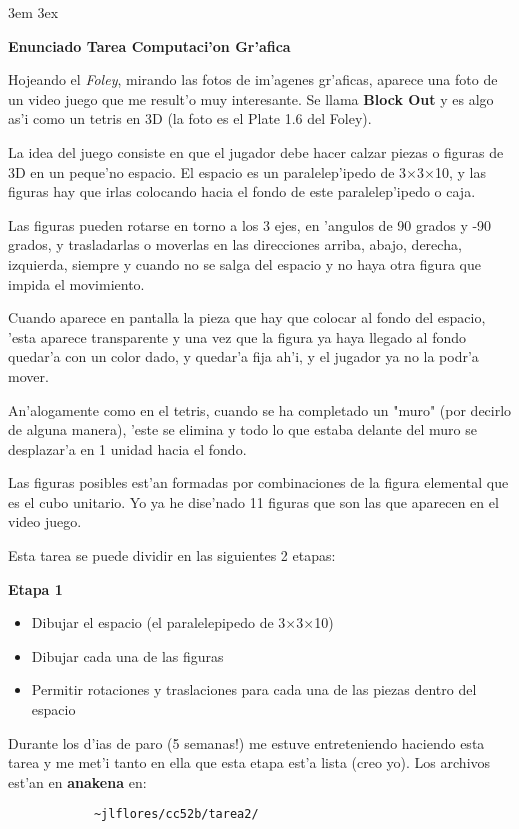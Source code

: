 \oddsidemargin 0cm
\textwidth 16cm 
\topmargin -1cm 
\headheight 0cm 
\textheight 22cm
\parindent 3em  
\parskip 3ex    


{\Large\bf Enunciado Tarea Computaci'on Gr'afica}

Hojeando el {\em Foley}, mirando las fotos de im'agenes gr'aficas, aparece una foto de un
video juego que me result'o muy interesante. Se llama {\bf Block Out} y es algo as'i como
un tetris en 3D (la foto es el Plate 1.6 del Foley).

La idea del juego consiste en que el jugador debe hacer calzar piezas o figuras de
3D en un peque'no espacio.
El espacio es un paralelep'ipedo de 3$\times$3$\times$10, y las figuras hay que irlas colocando
hacia el fondo de este paralelep'ipedo o caja. 

Las figuras pueden rotarse en torno a los 3 ejes, en 'angulos de 90 grados y -90 grados, y
trasladarlas o moverlas en las direcciones arriba, abajo, derecha, izquierda, 
siempre y cuando no se salga del espacio y no haya otra 
figura que impida el movimiento.

Cuando aparece en pantalla la pieza que hay que colocar al fondo del espacio, 'esta
aparece transparente y una vez que la figura ya haya llegado al fondo quedar'a con un
color dado, y quedar'a fija ah'i, y el jugador ya no la podr'a mover.

An'alogamente como en el tetris, cuando se ha completado un "muro" (por decirlo de
alguna manera), 'este se elimina y todo lo que estaba delante del muro  se desplazar'a
en 1 unidad hacia el fondo.

Las figuras posibles est'an formadas por combinaciones de la figura elemental que es
el cubo unitario.
Yo ya he dise'nado 11 figuras que son las que aparecen en el video juego.

Esta tarea se puede dividir en las siguientes 2 etapas:

{\large\bf Etapa 1}
\begin{itemize}
    \item Dibujar el espacio (el paralelepipedo de 3$\times$3$\times$10)
    \item Dibujar cada una de las figuras
    \item Permitir rotaciones y traslaciones para cada una de las piezas dentro del
     espacio
\end{itemize}
     Durante los d'ias de paro (5 semanas!) me estuve entreteniendo haciendo esta tarea y me met'i tanto en ella
     que esta etapa est'a lista (creo yo). Los archivos est'an en {\bf anakena} en:
\begin{verbatim}
            ~jlflores/cc52b/tarea2/
\end{verbatim}


